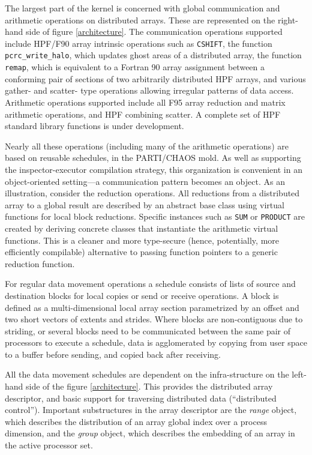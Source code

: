 The largest part of the kernel is concerned with global communication
and arithmetic operations on distributed arrays.  These are represented on
the right-hand side of figure \ref{architecture}.  
The communication operations supported include HPF/F90 array intrinsic
operations such as {\tt CSHIFT}, the function {\tt pcrc\_write\_halo}, which
updates ghost areas of a distributed array, the function {\tt remap},
which is equivalent to a Fortran 90 array assignment between a
conforming pair of sections of two arbitrarily distributed HPF arrays,
and various gather- and scatter- type operations allowing irregular patterns
of data access.  Arithmetic operations supported include all F95
array reduction and matrix arithmetic operations, and HPF
combining scatter.  A complete set of HPF standard library functions
is under development.

Nearly all these operations (including many of the arithmetic operations)
are based on reusable schedules, in the PARTI/CHAOS mold.  As well as
supporting the inspector-executor compilation strategy, this
organization is convenient in an object-oriented setting---a
communication pattern becomes an object.  As an illustration, consider
the reduction operations.  All reductions from a distributed
array to a global result are described by an abstract base class using
virtual functions for local block reductions.  Specific instances such
as {\tt SUM} or {\tt PRODUCT} are created by deriving concrete classes
that instantiate the arithmetic virtual functions.  This is a cleaner
and more type-secure (hence, potentially, more efficiently compilable)
alternative to passing function pointers to a generic reduction
function.

For regular data movement operations a schedule consists of lists of
source and destination blocks for local copies or send or receive
operations.  A block is defined as a multi-dimensional local array
section parametrized by an offset and two short vectors of extents and
strides.  Where blocks are non-contiguous due to striding, or several
blocks need to be communicated between the same pair of processors to
execute a schedule, data is agglomerated by copying from user space to
a buffer before sending, and copied back after receiving.

All the data movement schedules are dependent on the infra-structure on the
left-hand side of the figure \ref{architecture}.  This provides the
distributed array descriptor, and basic support for traversing
distributed data (``distributed control'').  Important substructures
in the array descriptor are the {\em range} object, which describes
the distribution of an array global index over a process
dimension, and the {\em group} object, which describes the embedding
of an array in the active processor set.


